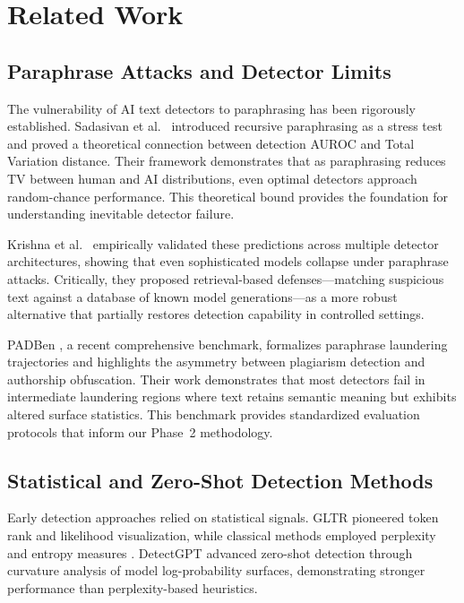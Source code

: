 \documentclass[conference]{IEEEtran}
\begin{document}
\section{Related Work}

\subsection{Paraphrase Attacks and Detector Limits}

The vulnerability of AI text detectors to paraphrasing has been rigorously established. Sadasivan et al.~\cite{sadasivan2023can} introduced recursive paraphrasing as a stress test and proved a theoretical connection between detection AUROC and Total Variation distance. Their framework demonstrates that as paraphrasing reduces TV between human and AI distributions, even optimal detectors approach random-chance performance. This theoretical bound provides the foundation for understanding inevitable detector failure.

Krishna et al.~\cite{krishna2023paraphrasing} empirically validated these predictions across multiple detector architectures, showing that even sophisticated models collapse under paraphrase attacks. Critically, they proposed retrieval-based defenses—matching suspicious text against a database of known model generations—as a more robust alternative that partially restores detection capability in controlled settings.

PADBen \cite{zha2024padben}, a recent comprehensive benchmark, formalizes paraphrase laundering trajectories and highlights the asymmetry between plagiarism detection and authorship obfuscation. Their work demonstrates that most detectors fail in intermediate laundering regions where text retains semantic meaning but exhibits altered surface statistics. This benchmark provides standardized evaluation protocols that inform our Phase~2 methodology.

\subsection{Statistical and Zero-Shot Detection Methods}

Early detection approaches relied on statistical signals. GLTR \cite{gehrmann2019gltr} pioneered token rank and likelihood visualization, while classical methods employed perplexity and entropy measures \cite{lavergne2008detecting}. DetectGPT \cite{mitchell2023detectgpt} advanced zero-shot detection through curvature analysis of model log-probability surfaces, demonstrating stronger performance than perplexity-based heuristics.
\end{document}
